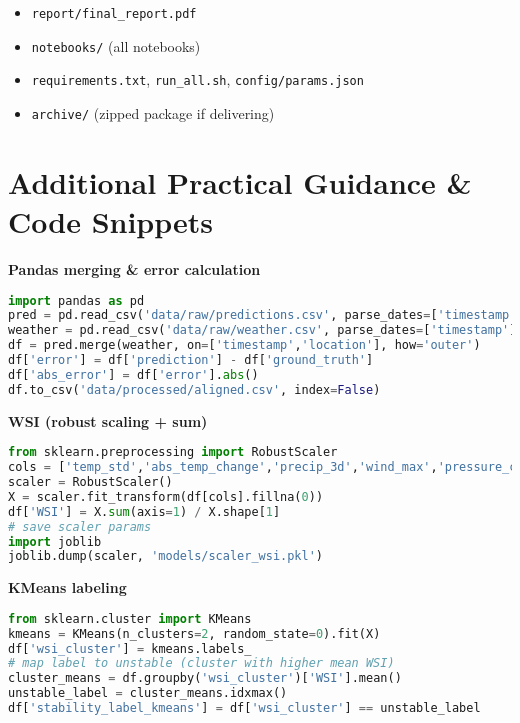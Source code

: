 \documentclass[11pt,a4paper]{article}
\begin{document}
\begin{deliverablebox}
\begin{itemize}
    \item \texttt{report/final\_report.pdf}
    \item \texttt{notebooks/} (all notebooks)
    \item \texttt{requirements.txt}, \texttt{run\_all.sh}, \texttt{config/params.json}
    \item \texttt{archive/} (zipped package if delivering)
\end{itemize}
\end{deliverablebox}

\section{Additional Practical Guidance \& Code Snippets}

\begin{codebox}
\textbf{Pandas merging \& error calculation}
\begin{lstlisting}[language=Python]
import pandas as pd
pred = pd.read_csv('data/raw/predictions.csv', parse_dates=['timestamp'])
weather = pd.read_csv('data/raw/weather.csv', parse_dates=['timestamp'])
df = pred.merge(weather, on=['timestamp','location'], how='outer')
df['error'] = df['prediction'] - df['ground_truth']
df['abs_error'] = df['error'].abs()
df.to_csv('data/processed/aligned.csv', index=False)
\end{lstlisting}
\end{codebox}

\begin{codebox}
\textbf{WSI (robust scaling + sum)}
\begin{lstlisting}[language=Python]
from sklearn.preprocessing import RobustScaler
cols = ['temp_std','abs_temp_change','precip_3d','wind_max','pressure_change','humid_std']
scaler = RobustScaler()
X = scaler.fit_transform(df[cols].fillna(0))
df['WSI'] = X.sum(axis=1) / X.shape[1]
# save scaler params
import joblib
joblib.dump(scaler, 'models/scaler_wsi.pkl')
\end{lstlisting}
\end{codebox}

\begin{codebox}
\textbf{KMeans labeling}
\begin{lstlisting}[language=Python]
from sklearn.cluster import KMeans
kmeans = KMeans(n_clusters=2, random_state=0).fit(X)
df['wsi_cluster'] = kmeans.labels_
# map label to unstable (cluster with higher mean WSI)
cluster_means = df.groupby('wsi_cluster')['WSI'].mean()
unstable_label = cluster_means.idxmax()
df['stability_label_kmeans'] = df['wsi_cluster'] == unstable_label
\end{lstlisting}
\end{codebox}
\end{document}
